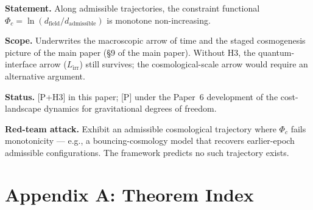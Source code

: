 \documentclass[11pt]{article}
\theoremstyle{remark}
\begin{document}
\begin{tcolorbox}[redteambox, title={H3 --- Constraint-functional monotonicity (\S\ref{sec:irr} closing)}]
\textbf{Statement.}  Along admissible trajectories, the constraint
functional $\Phi_c = \ln(d_{\mathrm{field}}/d_{\mathrm{admissible}})$ is
monotone non-increasing.

\textbf{Scope.}  Underwrites the macroscopic arrow of time and the staged
cosmogenesis picture of the main paper (\S 9 of the main paper).
Without H3, the quantum-interface arrow ($L_{\mathrm{irr}}$) still
survives; the cosmological-scale arrow would require an alternative
argument.

\textbf{Status.}  [P+H3] in this paper; [P] under the Paper~6 development
of the cost-landscape dynamics for gravitational degrees of freedom.

\textbf{Red-team attack.}  Exhibit an admissible cosmological trajectory
where $\Phi_c$ fails monotonicity --- e.g., a bouncing-cosmology model
that recovers earlier-epoch admissible configurations.  The framework
predicts no such trajectory exists.
\end{tcolorbox}


\section*{Appendix A: Theorem Index}
\label{sec:supp_index}
\end{document}
